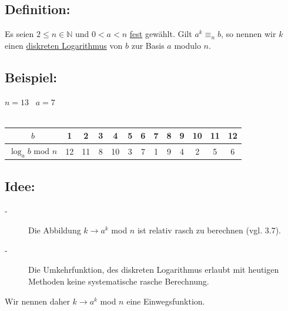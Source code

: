 \subsection{Definition:}
Es seien $ 2 \leq n \in \mathbb{N}$ und $0< a < n$ \underline{fest} gewählt. Gilt $a^{k} \equiv_{n} b$, so nennen wir $k$ einen \underline{diskreten Logarithmus} von $b$ zur Basis $a$ modulo $n$. 
%
%
%
\subsection{Beispiel:}
$n = 13$ \ $a = 7$\\
\qquad\\
\begin{tabular}{c|cccccccccccc} 
$b$ & 1 & 2 & 3 & 4 & 5 & 6 & 7 & 8 & 9 & 10 & 11 & 12 \\\hline 
$\log_{a} b$ mod $n$ & 12 & 11 & 8 & 10 & 3 & 7 & 1 & 9 & 4 & 2 & 5 & 6\\
\end{tabular} 
%
%
%
\subsection{Idee:}
\begin{description}
	\item[-] Die Abbildung $k \rightarrow a^{k}$ mod $n$ ist relativ rasch zu berechnen (vgl. 3.7).
	\item[-] Die Umkehrfunktion, des diskreten Logarithmus erlaubt mit heutigen Methoden keine systematische rasche Berechnung. 
\end{description}
Wir nennen daher $k \rightarrow a^{k} $ mod $ n$ eine Einwegsfunktion.
%
%
%
